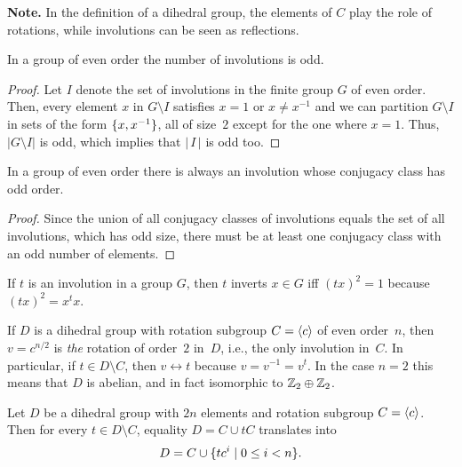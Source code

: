 \textbf{Note.} In the definition of a dihedral group, the elements of $C$ play the role of rotations, while involutions can be seen as reflections.

\begin{prop}
    In a group of even order the number of involutions is odd.
\end{prop}

\begin{proof} Let $I$ denote the set of involutions in the finite group $G$ of even order. Then, every element $x$ in $G\setminus I$ satisfies $x=1$ or $x\ne x^{-1}$ and we can partition $G\setminus I$ in sets of the form $\{x,x^{-1}\}$, all of size~$2$ except for the one where $x=1$. Thus, $|G\setminus I|$ is odd, which implies that $|\,I\,|$ is odd too.  \end{proof}

\begin{cor}
    In a group of even order there is always an involution whose conjugacy class has odd order.
\end{cor}

\begin{proof} Since the union of all conjugacy classes of involutions equals the set of all involutions, which has odd size, there must be at least one conjugacy class with an odd number of elements.  \end{proof}

\begin{rem}
    If\/ $t$ is an involution in a group\/ $G$, then\/ $t$ inverts\/ $x\in G$ iff\/ $(tx)^2=1$ because\/ $(tx)^2=x^tx$.
\end{rem}

\begin{rem}\label{rotation-involution}
    If\/ $D$ is a dihedral group with rotation subgroup\/ $C=\langle c\rangle$ of even order\/~$n$, then\/ $v=c^{n/2}$ is \textsl{the} rotation of order\/~$2$ in\/~$D$, i.e., the only involution in\/~$C$. In particular, if\/ $t\in D\setminus C$, then\/ $v\leftrightarrow t$ because\/ $v=v^{-1}=v^t$. In the case\/ $n=2$ this means that\/ $D$ is abelian, and in fact isomorphic to\/ $\mathbb{Z}_2\oplus\mathbb{Z}_2$.
\end{rem}

\begin{rem}\label{dihedral-elements}
    Let\/ $D$ be a dihedral group with\/ $2n$ elements and rotation subgroup\/ $C=\langle c\rangle$. Then for every\/ $t\in D\setminus C$, equality\/ $D=C\cup tC$ translates into
    $$
        D = C\cup\{tc^i\mid 0\le i< n\}.
    $$
\end{rem}

